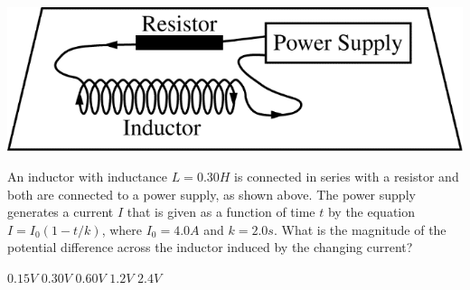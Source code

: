 
\begin{center}
    \includegraphics[scale=0.3]{images/img-005-009.png}
\end{center}

\begin{questions}
\setcounter{question}{6}

\question
An inductor with inductance $L=0.30 \unit{H}$ is connected in series with a resistor and both are connected to a power supply, as shown above. The power supply generates a current $I$ that is given as a function of time $t$ by the equation $I=I_{0}(1-t/k)$, where $I_{0}=4.0 \unit{A}$ and $k=2.0 \unit{s}$. What is the magnitude of the potential difference across the inductor induced by the changing current?

\begin{oneparchoices}
    \choice $0.15 \unit{V}$
    \choice $0.30 \unit{V}$
    \choice $0.60 \unit{V}$
    \choice $1.2 \unit{V}$
    \choice $2.4 \unit{V}$
\end{oneparchoices}

\end{questions}
